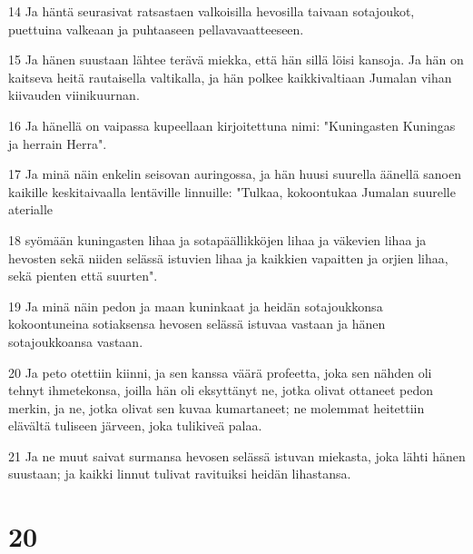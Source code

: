 \par 14 Ja häntä seurasivat ratsastaen valkoisilla hevosilla taivaan sotajoukot, puettuina valkeaan ja puhtaaseen pellavavaatteeseen.
\par 15 Ja hänen suustaan lähtee terävä miekka, että hän sillä löisi kansoja. Ja hän on kaitseva heitä rautaisella valtikalla, ja hän polkee kaikkivaltiaan Jumalan vihan kiivauden viinikuurnan.
\par 16 Ja hänellä on vaipassa kupeellaan kirjoitettuna nimi: "Kuningasten Kuningas ja herrain Herra".
\par 17 Ja minä näin enkelin seisovan auringossa, ja hän huusi suurella äänellä sanoen kaikille keskitaivaalla lentäville linnuille: "Tulkaa, kokoontukaa Jumalan suurelle aterialle
\par 18 syömään kuningasten lihaa ja sotapäällikköjen lihaa ja väkevien lihaa ja hevosten sekä niiden selässä istuvien lihaa ja kaikkien vapaitten ja orjien lihaa, sekä pienten että suurten".
\par 19 Ja minä näin pedon ja maan kuninkaat ja heidän sotajoukkonsa kokoontuneina sotiaksensa hevosen selässä istuvaa vastaan ja hänen sotajoukkoansa vastaan.
\par 20 Ja peto otettiin kiinni, ja sen kanssa väärä profeetta, joka sen nähden oli tehnyt ihmetekonsa, joilla hän oli eksyttänyt ne, jotka olivat ottaneet pedon merkin, ja ne, jotka olivat sen kuvaa kumartaneet; ne molemmat heitettiin elävältä tuliseen järveen, joka tulikiveä palaa.
\par 21 Ja ne muut saivat surmansa hevosen selässä istuvan miekasta, joka lähti hänen suustaan; ja kaikki linnut tulivat ravituiksi heidän lihastansa.

\chapter{20}

